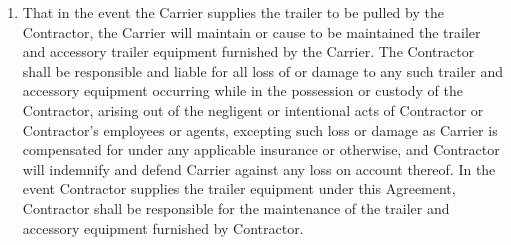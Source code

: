 {\begin{enumerate}[
        ref = \SecondLevelEnumerator
    ]
        \item That in the event the Carrier supplies the trailer to be
        pulled by the Contractor, the Carrier will maintain or cause to be
        maintained the trailer and accessory trailer equipment furnished by
        the Carrier. The Contractor shall be responsible and liable for all
        loss of or damage to any such trailer and accessory equipment
        occurring while in the possession or custody of the Contractor,
        arising out of the negligent or intentional acts of Contractor or
        Contractor's employees or agents, excepting such loss or damage as
        Carrier is compensated for under any applicable insurance or
        otherwise, and Contractor will indemnify and defend Carrier against
        any loss on account thereof. In the event Contractor supplies the
        trailer equipment under this Agreement, Contractor shall be
        responsible for the maintenance of the trailer and accessory
        equipment furnished by Contractor.
    \end{enumerate}
}